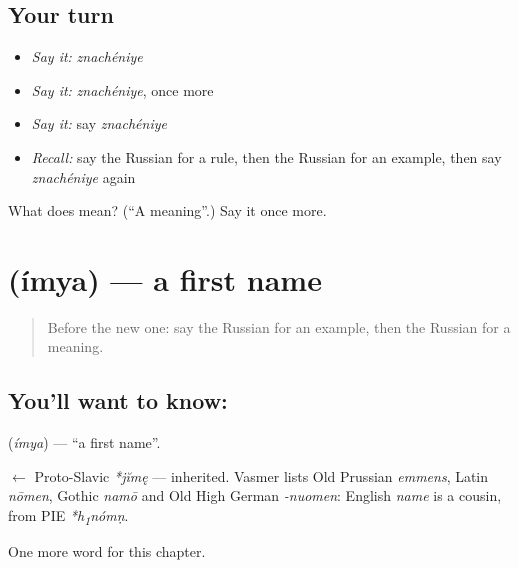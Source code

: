\subsection*{Your turn}
\begin{itemize}
\raggedright
  \item \emph{Say it:} \emph{znachéniye}
  \item \emph{Say it:} \emph{znachéniye}, once more
  \item \emph{Say it:} say \emph{znachéniye}
  \item \emph{Recall:} say the Russian for a rule, then the Russian for an example, then say \emph{znachéniye} again
\end{itemize}

\begin{tcolorbox}[breakable,colback=teal!4,colframe=teal!35!black,title={Before you move on}]
What does  mean? (\textquotedblleft{}A meaning\textquotedblright{}.) Say it once more.
\end{tcolorbox}
\section[\texorpdfstring{\ru{имя} (ímya)}{имя (ímya)}]{ (ímya) — a first name}

\label{lesson:RU-C228-imya}



\begin{quote}
Before the new one: say the Russian for an example, then the Russian for a meaning.
\end{quote}

\subsection*{You'll want to know: }
\textbf{} (\emph{ímya}) — \textquotedblleft{}a first name\textquotedblright{}.

\begin{cousinweb}
\textbf{} $\leftarrow$ Proto-Slavic \emph{*jĭmę} — inherited. Vasmer lists Old Prussian \emph{emmens}, Latin \emph{nōmen}, Gothic \emph{namō} and Old High German \emph{-nuomen}: English \emph{name} is a cousin, from PIE \emph{*h\textsubscript{1}nómṇ}.
\end{cousinweb}

\begin{grammarlens}[title={What you've built}]
One more word for this chapter.
\end{grammarlens}

